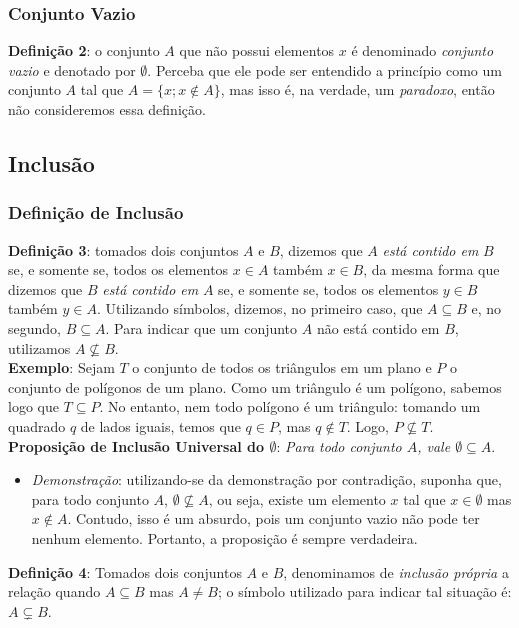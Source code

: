 \documentclass{article}
\begin{document}
\subsubsection{Conjunto Vazio}
\textbf{Definição 2}: o conjunto $A$ que não possui elementos $x$ é denominado \emph{conjunto vazio} e denotado por $\emptyset$. Perceba que ele pode ser entendido a princípio como um conjunto $A$ tal que $A = \{x; x \notin A\}$, mas isso é, na verdade, um \emph{paradoxo}, então não consideremos essa definição.

\subsection{Inclusão}
\subsubsection{Definição de Inclusão}
\textbf{Definição 3}: tomados dois conjuntos $A$ e $B$, dizemos que $A$ \emph{está contido em} $B$ se, e somente se, todos os elementos $x \in A$ também $x \in B$, da mesma forma que dizemos que $B$ \emph{está contido em} $A$ se, e somente se, todos os elementos $y \in B$ também $y \in A$. Utilizando símbolos, dizemos, no primeiro caso, que $A \subseteq B$ e, no segundo, $B \subseteq A$. Para indicar que um conjunto $A$ não está contido em $B$, utilizamos $ A \nsubseteq B$. \\
\textbf{Exemplo}: Sejam $T$ o conjunto de todos os triângulos em um plano e $P$ o conjunto de polígonos de um plano. Como um triângulo é um polígono, sabemos logo que $T \subseteq P$. No entanto, nem todo polígono é um triângulo: tomando um quadrado $q$ de lados iguais, temos que $q \in P$, mas $q \notin T$. Logo, $P \nsubseteq T$. \\
\textbf{Proposição de Inclusão Universal do $\emptyset$}: \emph{Para todo conjunto $A$, vale $\emptyset \subseteq A$}.
\begin{itemize}
    \item \emph{Demonstração}: utilizando-se da demonstração por contradição, suponha que, para todo conjunto $A$, $\emptyset \nsubseteq A$, ou seja, existe um elemento $x$ tal que $x \in \emptyset$ mas $x \notin A$. Contudo, isso é um absurdo, pois um conjunto vazio não pode ter nenhum elemento. Portanto, a proposição é sempre verdadeira.
\end{itemize}
\textbf{Definição 4}: Tomados dois conjuntos $A$ e $B$, denominamos de \emph{inclusão própria} a relação quando $A \subseteq B$ mas $A \ne B$; o símbolo utilizado para indicar tal situação é: $A \subsetneq B$. \\
\end{document}
